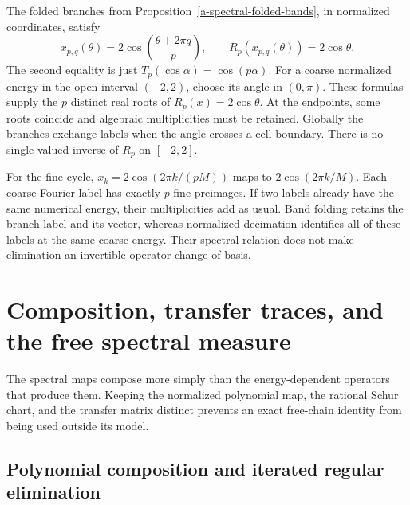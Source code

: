 The folded branches from Proposition~\ref{a-spectral-folded-bands},
in normalized coordinates, satisfy
\begin{equation}
 x_{p,q}(\theta)=2\cos\!\left(\frac{\theta+2\pi q}{p}\right),
 \qquad R_p(x_{p,q}(\theta))=2\cos\theta.
 \label{a-spectral-branch-relation}
\end{equation}
The second equality is just $T_p(\cos\alpha)=\cos(p\alpha)$.
For a coarse normalized energy in the open interval $(-2,2)$,
choose its angle in $(0,\pi)$. These formulas supply the $p$ distinct
real roots of $R_p(x)=2\cos\theta$. At the endpoints, some roots
coincide and algebraic multiplicities must be retained. Globally the
branches exchange labels when the angle crosses a cell boundary.
There is no single-valued inverse of $R_p$ on $[-2,2]$.

For the fine cycle, $x_k=2\cos(2\pi k/(pM))$ maps to
$2\cos(2\pi k/M)$. Each coarse Fourier label has exactly $p$ fine
preimages. If two labels already have the same numerical energy,
their multiplicities add as usual. Band folding retains the branch
label and its vector, whereas normalized decimation identifies all
of these labels at the same coarse energy. Their spectral relation
does not make elimination an invertible operator change of basis.


\section{Composition, transfer traces, and the free spectral measure}
\label{a-spectral-semigroup}

The spectral maps compose more simply than the energy-dependent
operators that produce them. Keeping the normalized polynomial map,
the rational Schur chart, and the transfer matrix distinct prevents an
exact free-chain identity from being used outside its model.

\subsection{Polynomial composition and iterated regular elimination}

